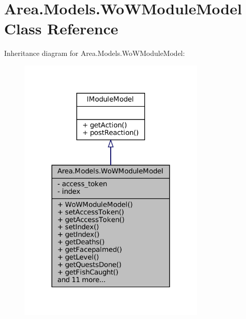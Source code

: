 \hypertarget{classArea_1_1Models_1_1WoWModuleModel}{}\section{Area.\+Models.\+Wo\+W\+Module\+Model Class Reference}
\label{classArea_1_1Models_1_1WoWModuleModel}


Inheritance diagram for Area.\+Models.\+Wo\+W\+Module\+Model\+:
\nopagebreak
\begin{figure}[H]
\begin{center}
\leavevmode
\includegraphics[width=252pt]{classArea_1_1Models_1_1WoWModuleModel__inherit__graph}
\end{center}
\end{figure}


